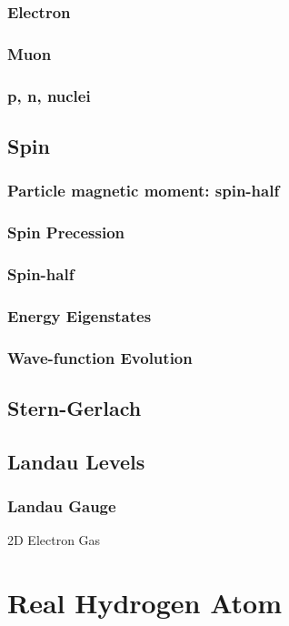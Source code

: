 \documentclass[12pt,a4paper]{article}
\begin{document}
\subsubsection{Electron}
\subsubsection{Muon}
\subsubsection{p, n, nuclei}
\subsection{Spin}
\subsubsection{Particle magnetic moment: spin-half}
\subsubsection{Spin Precession}
\subsubsection{Spin-half}
\subsubsection{Energy Eigenstates}
\subsubsection{Wave-function Evolution}
\subsection{Stern-Gerlach}
\subsection{Landau Levels}
\subsubsection{Landau Gauge}
\begin{example}
    {2D Electron Gas}
    {}
\end{example}
\section{Real Hydrogen Atom}
\end{document}
